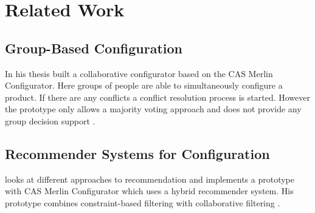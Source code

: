 \chapter{Related Work}
\label{ch:Related_Work}

\section{Group-Based Configuration}
\label{sec:Related_Work:GroupBasedConfiguration}

In his thesis \citeauthor{raabKollaborativeProduktkonfigurationEchtzeit2019} built a collaborative configurator based on the CAS Merlin Configurator. Here groups of people are able to simultaneously configure a product. If there are any conflicts a conflict resolution process is started. However the prototype only allows a majority voting approach and does not provide any group decision support \cite{raabKollaborativeProduktkonfigurationEchtzeit2019}.

\section{Recommender Systems for Configuration}
\label{sec:Related_Work:RecommenderSystemsForGonfiguration}

\citeauthor{rubinshteynEntwicklungHybridenRecommender2018} looks at different approaches to recommendation and implements a prototype with CAS Merlin Configurator which uses a hybrid recommender system. His prototype combines constraint-based filtering with collaborative filtering \cite{rubinshteynEntwicklungHybridenRecommender2018}.



\cite{benzMoeglichkeitenIntelligenterEmpfehlungssysteme2017}
\cite{ullmannEntwurfUndUmsetzung2017}
\cite{wetzelPersonalisierterUndLernender2017}


